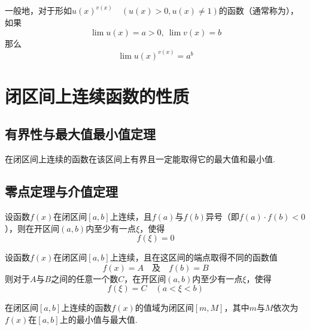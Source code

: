 \documentclass[lang=cn,10pt]{elegantbook}
\begin{document}
\begin{definition}[幂指函数]
	一般地，对于形如\( u(x)^{v(x)}\quad(u(x) > 0, u(x) \neq 1) \)的函数（通常称为），如果
	\[ \lim u(x) = a > 0,\ \lim v(x) = b \]
	那么
	\[ \lim u(x)^{v(x)} = a^{b} \]
\end{definition}

\section{闭区间上连续函数的性质}

\subsection{有界性与最大值最小值定理}
\begin{theorem}[有界性与最大值最小值定理]
	在闭区间上连续的函数在该区间上有界且一定能取得它的最大值和最小值.
\end{theorem}

\subsection{零点定理与介值定理}

\begin{theorem}[零点定理]
	设函数\( f(x) \)在闭区间\( [a,b] \)上连续，且\( f(a) \)与\( f(b) \)异号（即\( f(a) \cdot f(b) < 0 \)），则在开区间\( (a,b) \)内至少有一点\( \xi \)，使得
	\[ f(\xi) = 0 \]
\end{theorem}

\begin{theorem}[介值定理]
	设函数\( f(x) \)在闭区间\( [a,b] \)上连续，且在这区间的端点取得不同的函数值
	\[ f(x) = A \quad \text{及}\quad f(b) = B \]
	则对于\( A \)与\( B \)之间的任意一个数\( C \)，在开区间\( (a,b) \)内至少有一点\( \xi \)，使得
	\[ f(\xi) = C \quad (a < \xi < b) \]
\end{theorem}

\begin{corollary}
	在闭区间\( [a,b] \)上连续的函数\( f(x) \)的值域为闭区间\( [m,M] \)，其中\( m \)与\( M \)依次为\( f(x) \)在\( [a,b] \)上的最小值与最大值.
\end{corollary}

%
\end{document}
